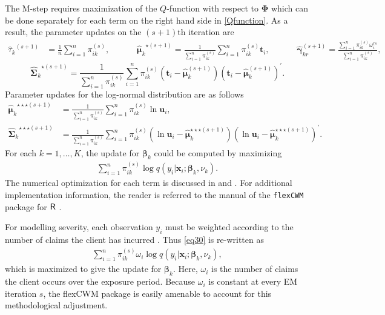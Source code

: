 \documentclass[12pt,letterpaper]{article}
\numberwithin{equation}{section}
\numberwithin{equation}{section}
\numberwithin{equation}{section}
\begin{document}
The M-step requires maximization of the $Q$-function with respect to $\bm \Phi$ which can be done separately for each term on the right hand side in \eqref{Qfunction}. %
As a result, the parameter updates on the $(s+1)$th iteration are
\begin{align*}
{\hat{\tau}_k}^{(s+1)}&=\frac{1}{n} \sum_{i=1}^n \pi_{ik}^{(s)}, && && {\hat{\bm{\mu}}_k}^{\star (s+1)}=\frac{1}{\sum_{i=1}^n \pi_{ik}^{(s)}} \sum_{i=1}^n \pi_{ik}^{(s)}\bm t_i, &&  && {\hat{\bm \gamma}^{(s+1)}_{kr}} =\frac{\sum_{i=1}^n \pi_{ik}^{(s)} \omega^{rs}_i} {\sum_{i=1}^n \pi_{ik}^{(s)}},
\end{align*}
$$
 {\widehat{\bm \Sigma^{}}_k}^{\star(s+1)}=\frac{1}{\sum_{i=1}^n \pi_{ik}^{(s)}} \sum_{i=1}^n \pi_{ik}^{(s)}(\bm t_i-\hat{\bm \mu}^{(s+1)}_k) (\bm t_i-\hat{\bm \mu}^{(s+1)}_k)^{'}.
$$
Parameter updates for the log-normal distribution are as follows
\begin{equation*}\begin{split}
{\hat{\bm \mu}_k}^{\star\star\star (s+1)}&=\frac{1}{\sum_{i=1}^n \pi_{ik}^{(s)}} \sum_{i=1}^n \pi_{ik}^{(s)}\ln \bm u_i,\\
{\widehat{\bm \Sigma}_k}^{\star\star\star(s+1)}&=\frac{1}{\sum_{i=1}^n \pi_{ik}^{(s)}} \sum_{i=1}^n \pi_{ik}^{(s)}(\ln \bm u_i-\hat{\bm \mu}^{\star\star\star(s+1)}_k) (\ln \bm u_i-\hat{\bm \mu}^{\star\star\star(s+1)}_k)^{'}. 
\end{split}\end{equation*}
For each $k=1,\ldots,K$, the update for $\bm{\beta}_k$ could be computed by maximizing
\begin{align}
\sum_{i=1}^{n}\pi^{(s)}_{ik} \log{q}(y_i|\bm x_i;\bm \beta_k,\nu_k).
\label{eq30}
\end{align}
The numerical optimization for each term is discussed in \cite{Wedel+DeSabro:1995} and \cite{Wedel:2002}.
For additional implementation information, the reader is referred to the manual of the {\tt flexCWM} package \citep{Ingrassia+Punzo+Vittadini+Minotti:2015} for ${\sf R}$ \citep{R18}.

For modelling severity, each observation $y_i$ must be weighted according to the number of claims the client has incurred \citep[see][pages 118--119]{frees2015}. Thus \eqref{eq30} is re-written as 
\begin{align}
\sum_{i=1}^{n}\pi^{(s)}_{ik} \mathcal{\omega}_i \log{q}(y_i|\bm x_i;\bm \beta_k,\nu_k),
\label{eqFrees}
\end{align}
which is maximized to give the update for $\bm{\beta}_k$.
Here, $\mathcal{\omega}_i$ is the number of claims the client occurs over the exposure period. Because $\mathcal{\omega}_i$ is constant at every EM iteration $s$, the flexCWM package is easily amenable to account for this methodological adjustment.
\end{document}

